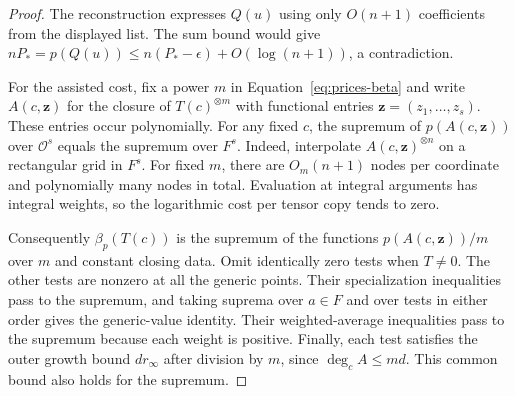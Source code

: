 \begin{proof}
The reconstruction expresses $Q(u)$ using only $O(n+1)$ coefficients
from the displayed list. The sum bound would give
$nP_*=p(Q(u))\le n(P_*-\epsilon)+O(\log(n+1))$, a contradiction.

For the assisted cost, fix a power $m$ in
Equation~\eqref{eq:prices-beta} and write $A(c,\mathbf z)$ for the
closure of $T(c)^{\otimes m}$ with functional entries
$\mathbf z=(z_1,\ldots,z_s)$. These entries occur polynomially.
For any fixed $c$, the supremum of $p(A(c,\mathbf z))$ over
$\mathcal O^s$ equals the supremum over $F^s$. Indeed, interpolate
$A(c,\mathbf z)^{\otimes n}$ on a rectangular grid in $F^s$. For
fixed $m$, there are $O_m(n+1)$ nodes per coordinate and polynomially
many nodes in total. Evaluation at integral arguments has integral
weights, so the logarithmic cost per tensor copy tends to zero.

Consequently $\beta_p(T(c))$ is the supremum of the functions
$p(A(c,\mathbf z))/m$ over $m$ and constant closing data. Omit
identically zero tests when $T\ne0$. The other tests are nonzero at
all the generic points. Their specialization inequalities pass to
the supremum, and taking suprema over $a\in F$ and over tests in
either order gives the generic-value identity. Their weighted-average
inequalities pass to the supremum because each weight is positive.
Finally, each test satisfies the outer growth bound $d r_\infty$
after division by $m$, since $\deg_c A\le md$. This common bound
also holds for the supremum.
\end{proof}

